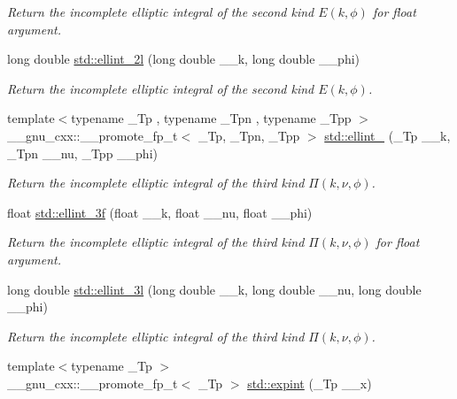 \begin{DoxyCompactItemize}
\begin{DoxyCompactList}\small\item\em Return the incomplete elliptic integral of the second kind $ E(k,\phi) $ for {\ttfamily float} argument. \end{DoxyCompactList}\item 
long double \hyperlink{group__tr29124__math__spec__func_ga5c791332d374a809d8ca16c69a1a30f5}{std\+::ellint\+\_\+2l} (long double \+\_\+\+\_\+k, long double \+\_\+\+\_\+phi)
\begin{DoxyCompactList}\small\item\em Return the incomplete elliptic integral of the second kind $ E(k,\phi) $. \end{DoxyCompactList}\item 
{\footnotesize template$<$typename \+\_\+\+Tp , typename \+\_\+\+Tpn , typename \+\_\+\+Tpp $>$ }\\\+\_\+\+\_\+gnu\+\_\+cxx\+::\+\_\+\+\_\+promote\+\_\+fp\+\_\+t$<$ \+\_\+\+Tp, \+\_\+\+Tpn, \+\_\+\+Tpp $>$ \hyperlink{group__tr29124__math__spec__func_ga3af251108b5384ca1f27350e47c8108e}{std\+::ellint\+\_} (\+\_\+\+Tp \+\_\+\+\_\+k, \+\_\+\+Tpn \+\_\+\+\_\+nu, \+\_\+\+Tpp \+\_\+\+\_\+phi)
\begin{DoxyCompactList}\small\item\em Return the incomplete elliptic integral of the third kind $ \Pi(k,\nu,\phi) $. \end{DoxyCompactList}\item 
float \hyperlink{group__tr29124__math__spec__func_ga1a80bd2c15bc9fbecda2630a9e9409e7}{std\+::ellint\+\_\+3f} (float \+\_\+\+\_\+k, float \+\_\+\+\_\+nu, float \+\_\+\+\_\+phi)
\begin{DoxyCompactList}\small\item\em Return the incomplete elliptic integral of the third kind $ \Pi(k,\nu,\phi) $ for {\ttfamily float} argument. \end{DoxyCompactList}\item 
long double \hyperlink{group__tr29124__math__spec__func_gaa8c0e5864df8769021a7f3e21a30c5d2}{std\+::ellint\+\_\+3l} (long double \+\_\+\+\_\+k, long double \+\_\+\+\_\+nu, long double \+\_\+\+\_\+phi)
\begin{DoxyCompactList}\small\item\em Return the incomplete elliptic integral of the third kind $ \Pi(k,\nu,\phi) $. \end{DoxyCompactList}\item 
{\footnotesize template$<$typename \+\_\+\+Tp $>$ }\\\+\_\+\+\_\+gnu\+\_\+cxx\+::\+\_\+\+\_\+promote\+\_\+fp\+\_\+t$<$ \+\_\+\+Tp $>$ \hyperlink{group__tr29124__math__spec__func_gac6d12da409bbd0e41dd1f7cdb3317252}{std\+::expint} (\+\_\+\+Tp \+\_\+\+\_\+x)

\end{DoxyCompactItemize}
